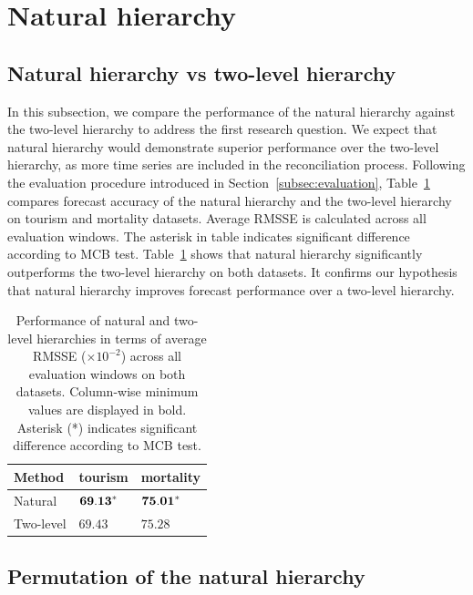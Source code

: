 \documentclass[a4paper,review,12pt,authoryear]{elsarticle}
\begin{document}
\section{Natural hierarchy}\label{sec:natural}

\subsection{Natural hierarchy vs two-level hierarchy}
\label{subsec:n_vs_twolevel}
In this subsection, we compare the performance of the natural hierarchy against the two-level hierarchy to address the first research question. We expect that natural hierarchy would demonstrate superior performance over the two-level hierarchy, as more time series are included in the reconciliation process.
Following the evaluation procedure introduced in Section~\ref{subsec:evaluation}, Table~\ref{tab:P1} compares forecast accuracy of the natural hierarchy and the two-level hierarchy on tourism and mortality datasets. Average RMSSE is calculated across all evaluation windows. 
The asterisk in table indicates significant difference according to MCB test.
Table~\ref{tab:P1} shows that natural hierarchy significantly outperforms the two-level hierarchy on both datasets.  It confirms our hypothesis that natural hierarchy improves forecast performance over a two-level hierarchy.

\begin{table}[h!]
    \centering
    \caption{\label{tab:P1} Performance of natural and two-level hierarchies in terms of average RMSSE ($\times 10^{-2}$) across all evaluation windows on both datasets. Column-wise minimum values are displayed in bold. Asterisk (*) indicates significant difference according to MCB test.}
    \begin{tabular}{lll}
    \toprule
        Method & tourism & mortality \\ \midrule
        Natural & $\bold{69.13}^*$ & $\bold{75.01}^*$ \\ 
        Two-level & $69.43$ & $75.28$ \\ \bottomrule
    \end{tabular}
    
\end{table}



\subsection{Permutation of the natural hierarchy}
\label{subsec:permutation}
\end{document}

